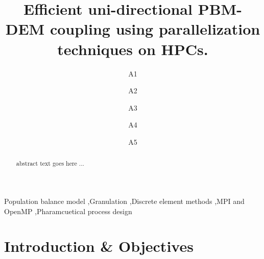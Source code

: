 \documentclass[preprint,11pt,authoryear]{elsarticle}
\begin{document}
\begin{frontmatter}
\title{ Efficient uni-directional PBM-DEM coupling using parallelization techniques on HPCs.}
\author{A1}
\author{A2}
\author{A3}
\author{A4}
\author{A5} 
\address{Department of Chemical and Biochemical Engineering, Rutgers, The State University of New Jersey, Piscataway, NJ, USA 08854}
\begin{abstract}
abstract text goes here ...
\end{abstract}
\begin{keyword}
Population balance model \sep Granulation \sep Discrete element methods  \sep MPI and OpenMP \sep Pharamcuetical process design
\end{keyword}
\end{frontmatter}
\linenumbers

\section{Introduction \& Objectives} 
\end{document}
